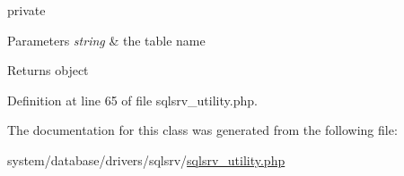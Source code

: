 private 
\begin{DoxyParams}{Parameters}
{\em string} & the table name \\
\hline
\end{DoxyParams}
\begin{DoxyReturn}{Returns}
object 
\end{DoxyReturn}


Definition at line 65 of file sqlsrv\-\_\-utility.\-php.



The documentation for this class was generated from the following file\-:\begin{DoxyCompactItemize}
\item 
system/database/drivers/sqlsrv/\hyperlink{sqlsrv__utility_8php}{sqlsrv\-\_\-utility.\-php}\end{DoxyCompactItemize}
